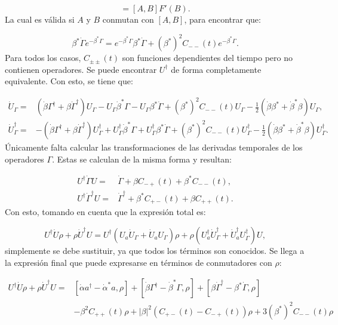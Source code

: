 \documentclass[a4paper,10pt]{report}
\begin{document}
\begin{equation}
[A,F(B)]=[A,B]F'(B).
\end{equation} La cual es válida si $A$ y $B$ conmutan con $[A,B]$, para encontrar que:

\begin{equation}
\beta^*\dot{\Gamma} e^{-\beta^* \Gamma} = e^{-\beta^* \Gamma}\beta^*\dot{\Gamma} + (\beta^*)^2 C_{--}(t) e^{-\beta^* \Gamma}.
\end{equation} Para todos los casos, $C_{\pm \pm}(t)$ son funciones dependientes del tiempo pero no contienen operadores. Se puede encontrar $U^\dagger$ de forma completamente equivalente. Con esto, se tiene que:

\begin{align}
\dot{U}_\Gamma =&(\dot{\beta}\Gamma^\dagger +\beta \dot{\Gamma}^\dagger)U_\Gamma - U_\Gamma\dot{\beta}^*\Gamma-U_\Gamma\beta^* \dot{\Gamma} + (\beta^*)^2 C_{--}(t)U_\Gamma-\frac{1}{2}(\dot{\beta} \beta^*+\dot{\beta}^* \beta)U_\Gamma, \\
\dot{U}^\dagger_\Gamma=&-(\dot{\beta}\Gamma^\dagger +\beta \dot{\Gamma}^\dagger)U_\Gamma^\dagger + U_\Gamma^\dagger\dot{\beta}^*\Gamma+U_\Gamma^\dagger\beta^* \dot{\Gamma} + (\beta^*)^2 C_{--}(t)U_\Gamma^\dagger-\frac{1}{2}(\dot{\beta} \beta^*+\dot{\beta}^* \beta)U_\Gamma^\dagger.
\end{align} Únicamente falta calcular las transformaciones de las derivadas temporales de los operadores $\Gamma$. Estas se calculan de la misma forma y resultan:

\begin{align}
U^{\dagger}\dot{\Gamma}U =& \dot{\Gamma} + \beta C_{-+}(t) +\beta^* C_{--}(t),\\
U^{\dagger}\dot{\Gamma}^\dagger U =& \dot{\Gamma}^\dagger + \beta^* C_{+-}(t) +\beta C_{++}(t). 
\end{align} Con esto, tomando en cuenta que la expresión total es:

\begin{equation}
U^\dagger \dot{U} \rho + \rho \dot{U}^\dagger U = U^\dagger(U_a \dot{U}_\Gamma+\dot{U}_a U_\Gamma)\rho + \rho(U_a^\dagger \dot{U}_\Gamma^\dagger+\dot{U}_a^\dagger U_\Gamma^\dagger)U,
\end{equation} simplemente se debe sustituir, ya que todos los términos son conocidos. Se llega a la expresión final que puede expresarse en términos de conmutadores con $\rho$:

\begin{align}
U^\dagger \dot{U} \rho + \rho \dot{U}^\dagger U =& [\dot{\alpha}a^\dagger - \dot{\alpha}^* a,\rho] +[\dot{\beta}\Gamma^\dagger - \dot{\beta}^* \Gamma,\rho]+  [\beta\dot{\Gamma}^\dagger - \beta^* \dot{\Gamma},\rho]\\
&-\nonumber\beta^2C_{++}(t)\rho + |\beta|^2(C_{+-}(t) - C_{-+}(t))\rho +3(\beta^*)^2C_{--}(t)\rho
\end{align}






\end{document}
